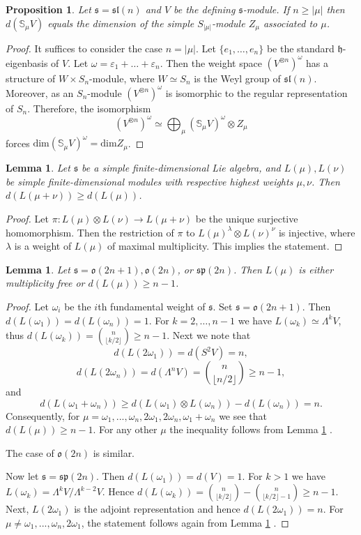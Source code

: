 \documentclass[12pt]{amsart}
\makeatletter
\def\@putname#1#2#3#4{\def\@@ref{#3}\let\old@bf\bf
        \def\bf##1{\old@bf\if?\noexpand##1?{#4}\else##1\fi}%
	#1{#2}%
        \let\bf\old@bf}
\def\@putname#1#2#3#4{\def\@@ref{#3}\let\old@bf\bf	%
	\let\old@reset@font\reset@font			%
        \def\bf##1{\old@bf\if?\noexpand##1?{#4}\else##1\fi}%
	\def\reset@font##1##2{\old@reset@font##1\if?\noexpand##2?{#4}\else##2\fi}#1{#2}%
        \let\bf\old@bf\let\reset@font\old@reset@font}
\let\my@ref=\ref
\def\ref#1{\@putname\my@ref{#1}{#1}{\tiny\rm\@@ref}}
\theoremstyle{plain} %
\numberwithin{equation}{section}
\theoremstyle{definition}
\theoremstyle{remark}
\theoremstyle{plain} %
\newtheorem{lemma}[definition]{Lemma}
\newtheorem{proposition}[definition]{Proposition}
\renewcommand{\sp}{\mathfrak{sp}}
\newcommand{\so}{\mathfrak{o}}
\renewcommand{\dim}{\mathrm{dim}}
\newcommand{\gs}{\mathfrak{s}}
\newcommand{\gh}{\mathfrak{h}}
\def\gh{\mathfrak{h}}
\def\gs{\mathfrak{s}}
\makeatother
\begin{document}
\begin{proposition}\label{finrankintegrablesl} Let $\gs=\mathfrak{sl}(n)$ and $V$ be the defining $\gs$-module. If $n\geq |\mu|$ then $d(\mathbb S_\mu V)$ equals the dimension of the simple $S_{|\mu|}$-module $Z_{\mu}$ associated to $\mu$. 
\end{proposition}
\begin{proof} It suffices to consider the case $n=|\mu|$. Let $\{e_1,\dots,e_{n}\}$ be the standard $\gh$-eigenbasis of $V$.
  Let $\omega=\varepsilon_1+\dots+\varepsilon_n$. Then the weight space $(V^{\otimes n})^\omega$ has a structure of $W\times S_n$-module,
  where $W\simeq S_n$ is the Weyl group of $\mathfrak{sl}(n)$. Moreover, as an $S_n$-module $(V^{\otimes n})^\omega$ is isomorphic to the regular representation of $S_n$. Therefore, the isomorphism
  $$(V^{\otimes n})^\omega\simeq \bigoplus_\mu{} (\mathbb S_\mu V)^\omega\otimes Z_\mu$$
 forces $\dim (\mathbb S_\mu V)^\omega = \dim Z_\mu$. 
\end{proof}
\begin{lemma}\label{estimate} Let $\gs$ be a simple finite-dimensional Lie algebra, and $L(\mu), L(\nu)$ be simple finite-dimensional modules with respective  highest weights $\mu,\nu$. Then $d(L(\mu+\nu))\geq d(L(\mu))$.
\end{lemma}
\begin{proof} 
	Let $\pi:L(\mu)\otimes L(\nu)\to L(\mu+\nu)$ be the unique surjective homomorphism. Then the restriction of $\pi$ to $L(\mu)^\lambda\otimes L(\nu)^\nu$ is injective,  where $\lambda$ is a weight of $L(\mu)$ of maximal multiplicity. This implies the statement.
\end{proof}
\begin{lemma}\label{degreefinite} Let $\gs=\so(2n+1),\so(2n)$, or $\sp(2n)$. Then $L(\mu)$  is either multiplicity free or $d(L(\mu))\geq n-1$. 
\end{lemma}
\begin{proof} Let  $\omega_i$ be the $i$th fundamental weight of $\gs$. Set $\gs=\so(2n+1)$. Then $d(L(\omega_1))=d(L(\omega_n))=1$. For $k=2,\dots,n-1$ we have $L(\omega_k)\simeq\Lambda^k V$, thus $d(L(\omega_k))=\binom{n}{\lfloor{k/2}\rfloor}\geq n-1$.
  Next we note that
  $$d(L(2\omega_1))=d(S^2 V)=n,$$
  $$d(L(2\omega_n))=d(\Lambda^n V )=\binom{n}{\lfloor{n/2}\rfloor}\geq n-1,$$
  and
  $$d(L(\omega_1+\omega_n))\geq d(L(\omega_1)\otimes L(\omega_n))-d(L(\omega_n))=n.$$
  Consequently,  for $\mu = \omega_1,...,\omega_n, 2\omega_1, 2\omega_n, \omega_1 + \omega_n$ we see that $d(L(\mu))\geq n-1$. For any other $\mu$ the inequality follows from Lemma \ref{estimate}.

  The case of $\so(2n)$ is similar.

  Now let $\gs=\sp(2n)$. Then $d(L(\omega_1))=d(V)=1$. For $k>1$ we have $L(\omega_k)=\Lambda^k V/\Lambda^{k-2} V$. Hence $d(L(\omega_k))=\binom{n}{\lfloor{k/2}\rfloor}-\binom{n}{\lfloor{k/2}\rfloor-1}\geq n-1$.
  Next, $L(2\omega_1)$ is the adjoint representation and hence $d(L(2\omega_1))=n$. For $\mu \neq \omega_1,...,\omega_n, 2\omega_1$,  the statement follows again from Lemma \ref{estimate}.
  \end{proof}
\end{document}
